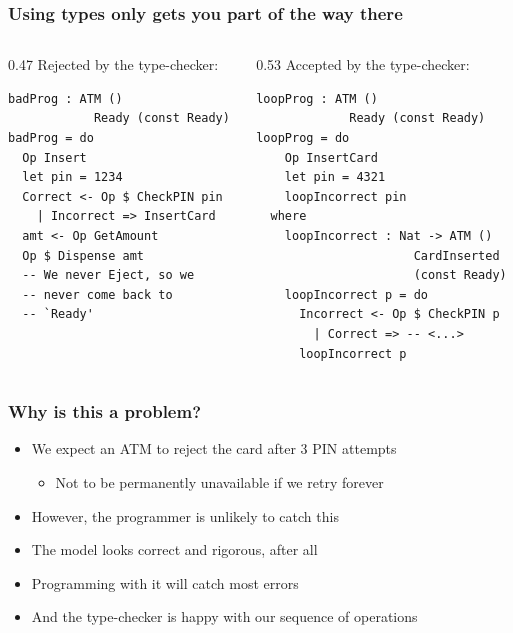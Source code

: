 \documentclass[compress,handout]{beamer}
\begin{document}
\begin{frame}[fragile]
  \frametitle{Using types only gets you part of the way there}

  \begin{columns}
  \begin{column}{0.47\framewidth}
    {\color{red} Rejected by the type-checker:}
    \vspace*{1mm}
    \begin{verbatim}
badProg : ATM ()
            Ready (const Ready)
badProg = do
  Op Insert
  let pin = 1234
  Correct <- Op $ CheckPIN pin
    | Incorrect => InsertCard
  amt <- Op GetAmount
  Op $ Dispense amt 
  -- We never Eject, so we
  -- never come back to
  -- `Ready'
    \end{verbatim}
    \vspace*{2.5mm}
  \end{column}

  \pause  %

  \hspace*{-0.6mm}
  \vrule{}

  \begin{column}{0.53\framewidth}
    {\color{orange} Accepted by the type-checker:}
    \vspace*{1mm}
    \begin{verbatim}
loopProg : ATM ()
             Ready (const Ready)
loopProg = do
    Op InsertCard
    let pin = 4321
    loopIncorrect pin
  where
    loopIncorrect : Nat -> ATM ()
                      CardInserted
                      (const Ready)
    loopIncorrect p = do
      Incorrect <- Op $ CheckPIN p
        | Correct => -- <...>
      loopIncorrect p
    \end{verbatim}
    \vspace*{-6mm}
  \end{column}
  \end{columns}
\end{frame}


\begin{frame}
  \frametitle{Why is this a problem?}

  \begin{itemize}
    \item<1-> We expect an ATM to reject the card after 3 PIN attempts
    \begin{itemize}
      \item<1-> Not to be permanently unavailable if we retry forever
    \end{itemize}
    \item<2-> However, the programmer is unlikely to catch this
    \item<3-> The model looks correct and rigorous, after all
    \item<4-> Programming with it will catch most errors
    \item<5-> And the type-checker is happy with our sequence of operations
  \end{itemize}
\end{frame}
\end{document}

